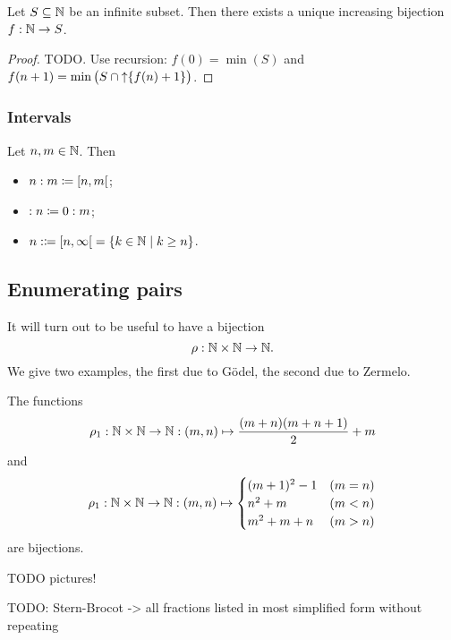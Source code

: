 \begin{lemma} \label{increasingEnumeration}
Let $S\subseteq \mathbb{N}$ be an infinite subset. Then there exists a unique increasing bijection $f: \mathbb{N}\to S$.
\end{lemma}
\begin{proof}
TODO. Use recursion: $f(0) = \min(S)$ and $f(n+1) = \min\big(S\cap \operatorname{\uparrow}\{f(n)+1\}\big)$.
\end{proof}


\subsubsection{Intervals}
\begin{definition}
Let $n,m\in \mathbb{N}$. Then
\begin{itemize}
\item $n:m \defeq \interval[co]{n,m}$;
\item $:n \coloneqq 0:m$;
\item $n: \defeq \interval[co]{n,\infty} = \setbuilder{k\in \N}{k\geq n}$.
\end{itemize}
\end{definition}

\subsection{Enumerating pairs}
It will turn out to be useful to have a bijection
\[ \rho: \mathbb{N}\times \mathbb{N} \to \mathbb{N}. \]
We give two examples, the first due to Gödel, the second due to Zermelo.
\begin{lemma} \label{pairEnumeration}
The functions
\[\rho_1 : \mathbb{N}\times\mathbb{N} \to \mathbb{N}: (m,n)\mapsto \frac{(m+n)(m+n+1)}{2}+m \]
and
\[ \rho_1 : \mathbb{N}\times\mathbb{N} \to \mathbb{N}: (m,n)\mapsto \begin{cases}
(m+1)^2-1 & (m=n) \\
n^2 + m & (m<n) \\
m^2+m+n & (m>n)
\end{cases} \]
are bijections.
\end{lemma}
TODO pictures!

TODO: Stern-Brocot -> all fractions listed in most simplified form without repeating


